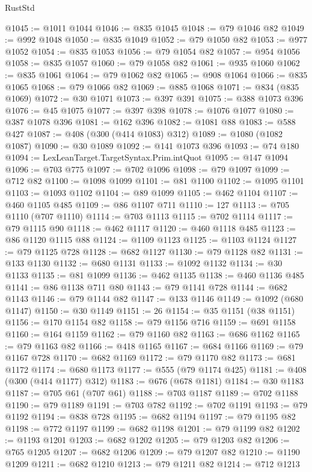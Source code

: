 \begin{lexlean}{RustStd}
\begin{coremodule}
@1045 := @1011 @1044
@1046 := @835 @1045
@1048 := @79 @1046 @82
@1049 := @992 @1048
@1050 := @835 @1049
@1052 := @79 @1050 @82
@1053 := @977 @1052
@1054 := @835 @1053
@1056 := @79 @1054 @82
@1057 := @954 @1056
@1058 := @835 @1057
@1060 := @79 @1058 @82
@1061 := @935 @1060
@1062 := @835 @1061
@1064 := @79 @1062 @82
@1065 := @908 @1064
@1066 := @835 @1065
@1068 := @79 @1066 @82
@1069 := @885 @1068
@1071 := @834 (@835 @1069)
@1072 := @30 @1071
@1073 := @397 @391
@1075 := @388 @1073 @396
@1076 := @45 @1075
@1077 := @397 @398
@1078 := @1076 @1077
@1080 := @387 @1078 @396
@1081 := @162 @396
@1082 := @1081 @88
@1083 := @588 @427
@1087 := @408 (@300 (@414 @1083) @312)
@1089 := @1080 (@1082 @1087)
@1090 := @30 @1089
@1092 := @141 @1073 @396
@1093 := @74 @180
@1094 := LexLeanTarget.TargetSyntax.Prim.intQuot
@1095 := @147 @1094
@1096 := @703 @775
@1097 := @702 @1096
@1098 := @79 @1097
@1099 := @712 @82
@1100 := @1098 @1099
@1101 := @81 @1100
@1102 := @1095 @1101
@1103 := @1093 @1102
@1104 := @89 @1099
@1105 := @462 @1104
@1107 := @460 @1105 @485
@1109 := @86 @1107 @711
@1110 := 127
@1113 := @705 @1110 (@707 @1110)
@1114 := @703 @1113
@1115 := @702 @1114
@1117 := @79 @1115 @90
@1118 := @462 @1117
@1120 := @460 @1118 @485
@1123 := @86 @1120 @1115 @88
@1124 := @1109 @1123
@1125 := @1103 @1124
@1127 := @79 @1125 @728
@1128 := @682 @1127
@1130 := @79 @1128 @82
@1131 := @133 @1130
@1132 := @680 @1131
@1133 := @1092 @1132
@1134 := @30 @1133
@1135 := @81 @1099
@1136 := @462 @1135
@1138 := @460 @1136 @485
@1141 := @86 @1138 @711 @80
@1143 := @79 @1141 @728
@1144 := @682 @1143
@1146 := @79 @1144 @82
@1147 := @133 @1146
@1149 := @1092 (@680 @1147)
@1150 := @30 @1149
@1151 := 26
@1154 := @35 @1151 (@38 @1151)
@1156 := @170 @1154 @82
@1158 := @79 @1156 @716
@1159 := @691 @1158
@1160 := @164 @1159
@1162 := @79 @1160 @82
@1163 := @686 @1162
@1165 := @79 @1163 @82
@1166 := @418 @1165
@1167 := @684 @1166
@1169 := @79 @1167 @728
@1170 := @682 @1169
@1172 := @79 @1170 @82
@1173 := @681 @1172
@1174 := @680 @1173
@1177 := @555 (@79 @1174 @425)
@1181 := @408 (@300 (@414 @1177) @312)
@1183 := @676 (@678 @1181)
@1184 := @30 @1183
@1187 := @705 @61 (@707 @61)
@1188 := @703 @1187
@1189 := @702 @1188
@1190 := @79 @1189
@1191 := @703 @782
@1192 := @702 @1191
@1193 := @79 @1192
@1194 := @838 @728
@1195 := @682 @1194
@1197 := @79 @1195 @82
@1198 := @772 @1197
@1199 := @682 @1198
@1201 := @79 @1199 @82
@1202 := @1193 @1201
@1203 := @682 @1202
@1205 := @79 @1203 @82
@1206 := @765 @1205
@1207 := @682 @1206
@1209 := @79 @1207 @82
@1210 := @1190 @1209
@1211 := @682 @1210
@1213 := @79 @1211 @82
@1214 := @712 @1213

\end{coremodule}
\end{lexlean}

